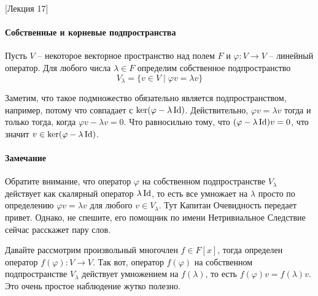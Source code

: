 [Лекция 17]


\paragraph{Собственные и корневые подпространства}

\begin{definition}
Пусть $V$ -- некоторое векторное пространство над полем $F$ и $\varphi \colon V\to V$ -- линейный оператор.
Для любого числа $\lambda \in F$ определим собственное подпространство
\[
V_\lambda = \{v\in V\mid \varphi v = \lambda v\}
\]
\end{definition}

Заметим, что такое подмножество обязательно является подпространством, например, потому что совпадает с $\ker (\varphi - \lambda \operatorname{Id})$.
Действительно, $\varphi v = \lambda v$ тогда и только тогда, когда $\varphi v - \lambda v = 0$.
Что равносильно тому, что $(\varphi - \lambda \operatorname{Id})v = 0$, что значит $v\in \ker(\varphi - \lambda \operatorname{Id})$.

\paragraph{Замечание}

Обратите внимание, что оператор $\varphi$ на собственном подпространстве $V_\lambda$ действует как скалярный оператор $\lambda \operatorname{Id}$, то есть все умножает на $\lambda$ просто по определению $\varphi v = \lambda v$ для любого $v\in V_\lambda$.
Тут Капитан Очевидность передает привет.
Однако, не спешите, его помощник по имени Нетривиальное Следствие сейчас расскажет пару слов.

Давайте рассмотрим произвольный многочлен $f\in F[x]$, тогда определен оператор $f(\varphi)\colon V\to V$.
Так вот, оператор $f(\varphi)$ на собственном подпространстве $V_\lambda$ действует умножением на $f(\lambda)$, то есть $f(\varphi) v = f(\lambda) v$.
Это очень простое наблюдение жутко полезно.


